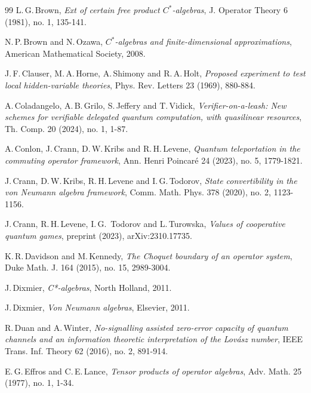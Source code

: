 \documentclass[11pt]{amsart}
\theoremstyle{definition}
\begin{document}
\begin{thebibliography}{99}
{\sc L.\,G.\,Brown}, 
{\it Ext of certain free product $C^*$-algebras},
{\rm J. Operator Theory 6 (1981),
no. 1, 135-141}.

{\sc N.\,P.\,Brown and N.\,Ozawa},
{\it $C^*$-algebras and finite-dimensional approximations},
{\rm  American Mathematical Society, 2008}.


{\sc J.\,F.\,Clauser, M.\,A.\,Horne, A.\,Shimony and R.\,A.\,Holt},
{\it Proposed experiment to test local hidden-variable theories},
{\rm Phys. Rev. Letters 23 (1969), 880-884}.

{\sc A.\,Coladangelo, A.\,B.\,Grilo, S.\,Jeffery and T.\,Vidick}, 
{\it Verifier-on-a-leash: New schemes for verifiable delegated quantum computation, with quasilinear resources}, 
{\rm Th. Comp. 20 (2024), no. 1, 1-87}.



{\sc A.\,Conlon, J.\,Crann, D.\,W.\,Kribs and R.\,H.\,Levene},
{\it Quantum teleportation in the commuting operator framework},
{\rm Ann. Henri Poincar\'{e} 24 (2023), no. 5, 1779-1821}.

{\sc J.\,Crann, D.\,W.\,Kribs, R.\,H.\,Levene and I.\,G.\,Todorov}, 
{\it State convertibility in the von Neumann algebra framework}, 
{\rm Comm. Math. Phys. 378 (2020), no. 2, 1123-1156}.

{\sc J.\,Crann, R.\,H.\,Levene, I.\,G.\, Todorov and L.\,Turowska},
{\it Values of cooperative quantum games},
{\rm preprint (2023), arXiv:2310.17735}.

{\sc K.\,R.\,Davidson and M.\,Kennedy}, 
{\it The Choquet boundary of an operator system},
{\rm Duke Math. J. 164 (2015), no. 15, 2989-3004}.


{\sc J.\,Dixmier},
{\it C*-algebras}, 
{\rm North Holland, 2011}.

{\sc J.\,Dixmier},
{\it Von Neumann algebras}, 
{\rm Elsevier, 2011}.


{\sc R.\,Duan and A.\,Winter},
{\it No-signalling assisted zero-error capacity of quantum channels and an
information theoretic interpretation of the Lov\'{a}sz number},
{\rm IEEE Trans. Inf. Theory 62 (2016), no. 2, 891-914}.

{\sc E.\,G.\,Effros and C.\,E.\,Lance},
{\it Tensor products of operator algebras},
{\rm Adv. Math. 25 (1977), no. 1, 1-34}.


\end{thebibliography}
\end{document}
